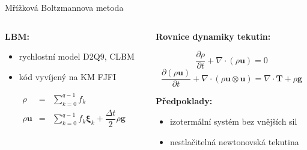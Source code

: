\documentclass[aspectratio=169,xcolor=dvipsnames]{beamer}
\newcommand{\vect}[1]{\mathbf{#1}}
\begin{document}
\begin{frame}{Mřížková Boltzmannova metoda}
	\begin{columns}[T] %
		\begin{column}{.45\textwidth}
			\textbf{LBM:}\\
			\begin{itemize}
				\item rychlostní model D2Q9, CLBM
				\item kód vyvíjený na KM FJFI
			\end{itemize}
		\begin{eqnarray*}
			\rho &=& \sum_{k=0}^{q-1} f_{k}\\[3pt]
			\rho \vect{u} &=& \sum_{k=0}^{q-1} f_{k} \boldsymbol{\xi}_{k} + \dfrac{\Delta t}{2} \rho \boldsymbol{g}
		\end{eqnarray*}
		\end{column}%
		\begin{column}{.5\textwidth}
			\textbf{Rovnice dynamiky tekutin:}
			\vspace{-13pt}
			\begin{center}
				$$\frac{\partial \rho}{\partial t} + \nabla \cdot (\rho \vect{u}) = 0 $$
				$$\frac{\partial (\rho \vect{u})}{\partial t} + \nabla \cdot (\rho \vect{u} \otimes \vect{u}) = \nabla \cdot \mathbf{T} + \rho \boldsymbol{g}$$
			\end{center}%
			\vspace{11pt}
			\textbf{Předpoklady:}\\[2pt]
			\begin{itemize}
				\item izotermální systém bez vnějších sil
				\item nestlačitelná newtonovská tekutina
			\end{itemize}
		\end{column}%
	\end{columns}
\end{frame}
\end{document}
